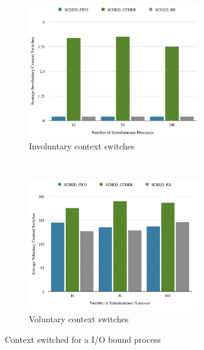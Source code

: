 \documentclass[12pt]{article}
\begin{document}
\begin{figure}[!htb]
  \centering
  \begin{subfigure}[t]{0.4\textwidth}
    \centering
    \includegraphics[width=75mm]{IOIC.png}
    \caption{Involuntary context switches}
    \label{fig:ioic}
  \end{subfigure}
  ~
  \begin{subfigure}[t]{0.4\textwidth}
    \centering
    \includegraphics[width=75mm]{IOVC.png}
    \caption{Voluntary context switches}
    \label{fig:iovc}
  \end{subfigure}
  \caption{Context switched for a I/O bound process}
\end{figure}
\end{document}

